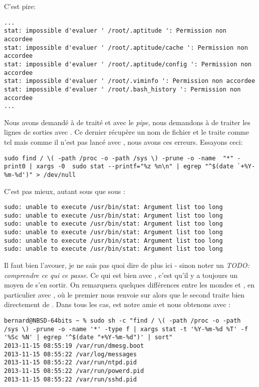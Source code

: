 C'est pire:

\begin{lstlisting}[caption=problèmes de droits part I en pire certifié]
...
stat: impossible d'evaluer ' /root/.aptitude ': Permission non accordee
stat: impossible d'evaluer ' /root/.aptitude/cache ': Permission non accordee
stat: impossible d'evaluer ' /root/.aptitude/config ': Permission non accordee
stat: impossible d'evaluer ' /root/.viminfo ': Permission non accordee
stat: impossible d'evaluer ' /root/.bash_history ': Permission non accordee
...
\end{lstlisting}

Nous avons demandé à  de traité  et avec le \emph{pipe}, nous demandons à  de traiter les lignes de sorties avec . Ce dernier récupère un nom de fichier et le traite comme tel mais comme il n'est pas lancé avec , nous avons ces erreurs. Essayons ceci:

\begin{lstlisting}[caption=problèmes de droits part II]
sudo find / \( -path /proc -o -path /sys \) -prune -o -name  "*" -print0 | xargs -0  sudo stat --printf="%z %n\n" | egrep "^$(date `+%Y-%m-%d')" > /dev/null
\end{lstlisting}

C'est pas mieux, autant sous \linux{} que sous \netbsd{}:

\begin{lstlisting}[caption=problèmes de droits part II avec un pir]
sudo: unable to execute /usr/bin/stat: Argument list too long
sudo: unable to execute /usr/bin/stat: Argument list too long
sudo: unable to execute /usr/bin/stat: Argument list too long
sudo: unable to execute /usr/bin/stat: Argument list too long
sudo: unable to execute /usr/bin/stat: Argument list too long
sudo: unable to execute /usr/bin/stat: Argument list too long
\end{lstlisting}

Il faut bien l'avouer, je ne sais pas quoi dire de plus ici - sinon noter un \emph{TODO: comprendre ce qui ce passe}. Ce qui est bien avec \unix{}, c'est qu'il y a toujours un moyen de s'en sortir. On remarquera quelques différences entre les mondes \linux{} et \BSD{}, en particulier avec , où le premier nous renvoie sur \bash{} alors que le second traite bien directement de \sh{}. Dans tous les cas,  est notre amie et nous obtenons avec  \netbsd{}:

\begin{lstlisting}[caption=problèmes de droits part II et fin du pire pour NetBSD]
bernard@NBSD-64bits ~ % sudo sh -c "find / \( -path /proc -o -path /sys \) -prune -o -name '*' -type f | xargs stat -t '%Y-%m-%d %T' -f '%Sc %N' | egrep '^$(date "+%Y-%m-%d")' | sort"
2013-11-15 08:55:19 /var/run/dmesg.boot
2013-11-15 08:55:22 /var/log/messages
2013-11-15 08:55:22 /var/run/ntpd.pid
2013-11-15 08:55:22 /var/run/powerd.pid
2013-11-15 08:55:22 /var/run/sshd.pid
\end{lstlisting}

